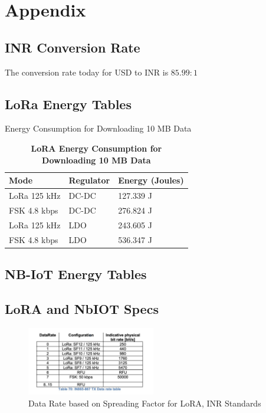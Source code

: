 \section{Appendix}
\subsection{INR Conversion Rate}\label{conv:Rupee} 
The conversion rate today for USD to INR is $85.99:1$

\subsection{LoRa Energy Tables}
 
\pagebreak
\begin{table}[]
    \centering
    \small
    \caption{Energy Consumption for Downloading 10 MB Data}
    \begin{tabularx}{\columnwidth}{l l l}
    \toprule
    Mode & Regulator & Energy (Joules) \\
    \midrule
    LoRa 125 kHz & DC-DC & 127.339 J \\
    FSK 4.8 kbps & DC-DC & 276.824 J \\
    LoRa 125 kHz & LDO & 243.605 J \\
    FSK 4.8 kbps & LDO & 536.347 J \\
    \bottomrule
    \end{tabularx}
    \caption{\textbf{LoRA Energy Consumption for Downloading 10 MB Data}}
    \label{tab:loraRx}
\end{table} 
\pagebreak
\subsection{NB-IoT Energy Tables}
 
\pagebreak
 
\pagebreak
\subsection{LoRA and NbIOT Specs}
\begin{figure}
    \centering
    \includegraphics[width=0.5\textwidth]{figures/DataRate.jpg}
    \caption{Data Rate based on Spreading Factor for LoRA, INR Standards}
    \label{fig:lora}
\end{figure} 
\pagebreak
 
\pagebreak

